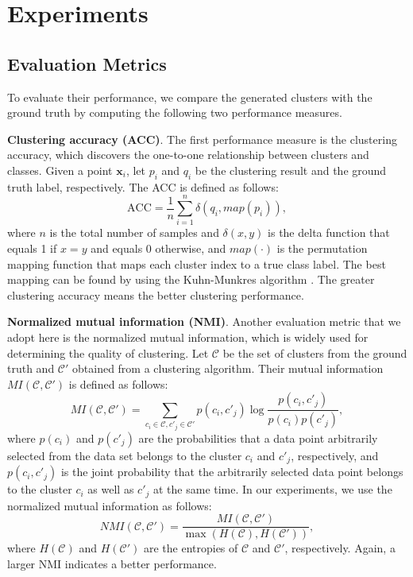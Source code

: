 \documentclass[10pt,journal,compsoc]{IEEEtran}
\begin{document}
\section{Experiments}
\subsection{Evaluation Metrics}
  To evaluate their performance, we compare the generated clusters with the ground truth by computing the following two performance measures.
  
  \textbf{Clustering accuracy (ACC)}. The first performance measure is the clustering accuracy, which discovers the one-to-one relationship between clusters and classes. Given a point $\mathbf{x}_i$, let $p_i$ and $q_i$ be the clustering result and the ground truth label, respectively. The ACC is defined as follows:
  \begin{equation}
    \textrm{ACC} = \frac{1}{n}\sum_{i=1}^{n}\delta(q_i, map(p_i)),
  \end{equation}
  where $n$ is the total number of samples and $\delta(x,y)$ is the delta function that equals 1 if $x=y$ and equals 0 otherwise, and $map(\cdot)$ is the permutation mapping function that maps each cluster index to a true class label. The best mapping can be found by using the Kuhn-Munkres algorithm \cite{map}. The greater clustering accuracy means the better clustering performance.
  
  \textbf{Normalized mutual information (NMI)}. Another evaluation metric that we adopt here is the normalized mutual information, which is widely used for determining the quality of clustering. Let $\mathcal{C}$ be the set of clusters from the ground truth and $\mathcal{C'}$ obtained from a clustering algorithm. Their mutual information $MI(\mathcal{C}, \mathcal{C'})$ is defined as follows:
  \begin{equation}
    MI(\mathcal{C}, \mathcal{C'}) = \sum_{c_i \in \mathcal{C},c'_j \in \mathcal{C'}} p(c_i,c'_j) \log \frac{p(c_i,c'_j)}{p(c_i) p(c'_j)},
  \end{equation}
  where $p(c_i)$ and $p(c'_j)$ are the probabilities that a data point arbitrarily selected from the data set belongs to the cluster $c_i$ and $c'_j$, respectively, and $p(c_i,c'_j)$ is the joint probability that the arbitrarily selected data point belongs to the cluster $c_i$ as well as $c'_j$ at the same time. In our experiments, we use the normalized mutual information as follows:
  \begin{equation}
    NMI(\mathcal{C}, \mathcal{C'}) = \frac{MI(\mathcal{C}, \mathcal{C'})}{\max(H(\mathcal{C}), H(\mathcal{C'}))},
  \end{equation}
  where $H(\mathcal{C})$ and  $H(\mathcal{C'})$ are the entropies of $\mathcal{C}$ and $\mathcal{C'}$, respectively. Again, a larger NMI indicates a better performance.
\end{document}
